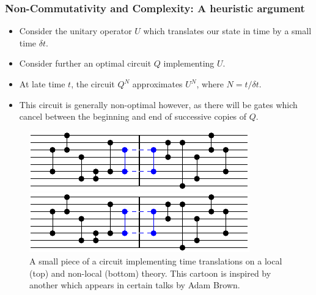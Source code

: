 \documentclass[8pt,aspectratio=169]{beamer}
\begin{document}
\begin{frame}
\frametitle{Non-Commutativity and Complexity: A heuristic argument}

\begin{minipage}[t]{0.5\linewidth}

\begin{itemize}

\item Consider the unitary operator $U$ which translates our state in time by a small time $\delta t$. 

\item Consider further an optimal circuit $Q$ implementing $U$.

\item At late time $t$, the circuit $Q^N$ approximates $U^N$, where $N= t/\delta t$.

\item This circuit is generally non-optimal however, as there will be gates which cancel between the beginning and end of successive copies of $Q$.

\end{itemize}

\end{minipage}\hfill
%
\begin{minipage}[t]{0.48\linewidth}

\begin{figure}
    \begin{center}
    
        \includegraphics[scale=1]{animation/animation_2}    
        
        \vspace{2mm}
        
        \includegraphics[scale=1]{animation/animation_2}    
    
    \end{center}
    \caption{A small piece of a circuit implementing time translations on a local (top) and non-local (bottom) theory. This cartoon is inspired by another which appears in certain talks by Adam Brown.}
\end{figure}

\end{minipage}

\end{frame}
\end{document}
